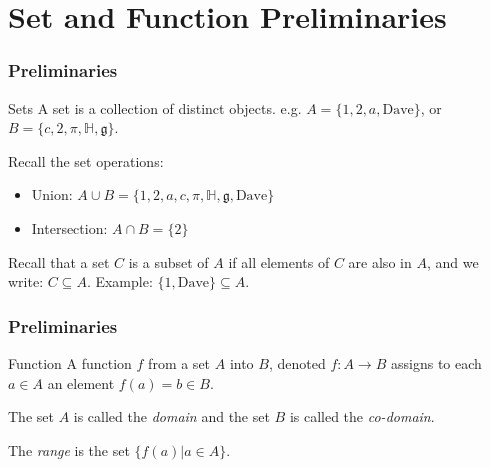 \documentclass{beamer}
\begin{document}

\section{Set and Function Preliminaries}


\begin{frame}
  \frametitle{Preliminaries}
  \begin{block}{Sets}
    A set is a collection of distinct objects. e.g. $A = \{1,2,a,\mbox{Dave}\}$, or $B = \{c, 2, \pi, \mathbb{H}, \mathfrak{g}\}$.
  \end{block}
  Recall the set operations:
  \begin{itemize}
    \item Union: $A \cup B = \{1,2,a,c,\pi,\mathbb{H},\mathfrak{g},\mbox{Dave}\}$
    \item Intersection: $A \cap B = \{2\}$
  \end{itemize}
  Recall that a set $C$ is a subset of $A$ if all elements of $C$ are also in $A$, and we write: $C \subseteq A$. Example: $\{1,\mbox{Dave}\}\subseteq A$.
\end{frame}
\begin{frame}
  \frametitle{Preliminaries}
  \begin{block}{Function}
    A function $f$ from a set $A$ into $B$, denoted $f: A \rightarrow B$ assigns to each $a \in A$ an element $f(a) = b \in B$.

    The set $A$ is called the \emph{domain} and the set $B$ is called the \emph{co-domain}.

    The \emph{range} is the set $\{ f(a) | a \in A \}$.
  \end{block}
  \begin{example}
    \begin{center}
  \end{center}
  \end{example}
\end{frame}
\end{document}

